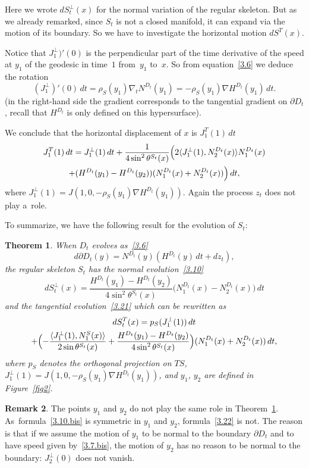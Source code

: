 \documentclass[10pt]{amsart}
\theoremstyle{plain}
\newtheorem{thm}{Theorem}[section]
\theoremstyle{definition}
\newtheorem{remark}[thm]{Remark}
\let\f\frac
\let\n\nabla
\let\pa\partial
\begin{document}
Here we wrote $dS_t^\perp (x)$ for the normal variation of the regular skeleton. But as we already remarked, since $S_t$ is not a closed manifold, it can expand via the motion of its boundary. So we have to investigate the horizontal motion $dS^T(x)$.

{Notice that $J_1^\perp)'(0)$ is the perpendicular part of the time derivative of the speed at $y_1$ of the geodesic in time~$1$ from~$y_1$ to~$x$. So
from} equation~\eqref{3.6} we deduce the rotation
\begin{equation}%
(J_1^\perp)'(0)\,dt= {{\rho_S(y_1)}}\n_{t}N^{D_t}(y_1)=-{{\rho_S(y_1)}}\n H^{D_t}(y_1)\,dt.
\end{equation}
{(in the right-hand side the gradient corresponds to the tangential gradient on $\pa D_t$, recall that $H^{D_t}$ is only defined on this hypersurface).}\par
We conclude that the horizontal displacement of $x$ is $J^T_1(1)\,dt$
\begin{multline}
\label{3.21}
J^T_1(1)\,dt=J_1^\perp(1)\,dt+\f1{4\sin^2\theta^{S_t}(x)}\Bigl(2\langle J_1^\perp(1),N^{D_t}_2(x)\rangle N^{D_t}_1(x)\\
+(H^{D_t}(y_1)-H^{D_t}(y_2))(N^{D_t}_1(x)+N^{D_t}_2(x))\Bigr)\,dt,
\end{multline}
where $J_1^\perp(1)\!=\!J(1,0,-{\rho_S(y_1)}\n H^{D_t}(y_1))$.
Again the process $z_t$ does not play a~role.

To summarize, we have the following result for the evolution of $S_t$:
\begin{thm}
\label{T3.1}
When $D_t$ evolves as~\eqref{3.6}
\begin{equation}
\label{3.7.bis}
d\partial D_t(y)=N^{D_t}(y)(H^{D_t}(y)\, dt +dz_t),
\end{equation}
the regular skeleton $S_t$ has the normal evolution~\eqref{3.10}
\begin{equation}
\label{3.10.bis}
dS_t^\perp (x)=\f{H^{D_t}(y_1)-H^{D_t}(y_2)}{4\sin^2\theta^{S_t}(x)}\bigl(N_1^{D_t}(x)-N_2^{D_t}(x)\bigr)\, dt
\end{equation}
and the tangential evolution~\eqref{3.21} which can be rewritten as
\begin{multline}
\label{3.22}
dS_t^T(x)=p_S(J_1^\perp(1))\, dt\\
+\Bigl(-\f{\langle J_1^\perp(1), N_1^S(x)\rangle}{2\sin\theta^{S_t}(x)}+\f{H^{D_t}(y_1)-H^{D_t}(y_2)}{4\sin^2\theta^{S_t}(x)}\Bigr)(N^{D_t}_1(x)+N^{D_t}_2(x))\,dt,
\end{multline}
where $p_S$ denotes the orthogonal projection on $TS$, $J_1^\perp(1)\!=\!J(1,0,-{\rho_S(y_1)}\n H^{D_t}(y_1))$, and $y_1$, $y_2$ are defined in Figure~\ref{fig2}.
\end{thm}
\begin{remark}
\label{R3.1}
The points $y_1$ and $y_2$ do not play the same role in Theorem~\ref{T3.1}. As~for\-mula~\eqref{3.10.bis} is symmetric in $y_1$ and $y_2$, formula~\eqref{3.22} is not. The reason is that if we assume the motion of $y_1$ to be normal to the boundary $\partial D_t$ and to have speed given by~\eqref{3.7.bis}, the motion of $y_2$ has no reason to be normal to the boundary: $J_2^\perp(0)$ does not vanish.
\end{remark}
\end{document}
